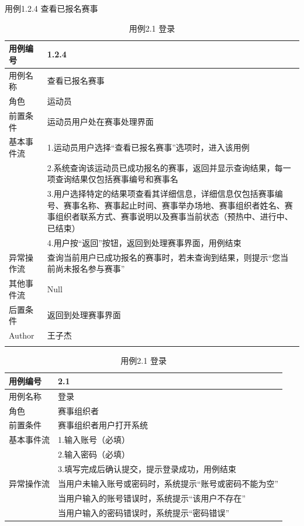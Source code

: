 \documentclass[a4paper,UTF8]{article}
\begin{document}
\begin{table}[H]
	\begin{center}
		\caption{用例1.2.4 查看已报名赛事}
		\label{table:Tab_uc124}
		\begin{tabular}{|p{}|p{}|}
			\hline\noalign{\smallskip}
			用例编号 & 1.2.4\\
			\hline
			用例名称 & 查看已报名赛事\\
			\hline
			角色 & 运动员\\
			\hline
			前置条件 & 运动员用户处在赛事处理界面\\
			\hline
			基本事件流 & 1.运动员用户选择“查看已报名赛事”选项时，进入该用例 \\& 2.系统查询该运动员已成功报名的赛事，返回并显示查询结果，每一项查询结果仅包括赛事编号和赛事名 \\& 3.用户选择特定的结果项查看其详细信息，详细信息仅包括赛事编号、赛事名称、赛事起止时间、赛事举办场地、赛事组织者姓名、赛事组织者联系方式、赛事说明以及赛事当前状态（预热中、进行中、已结束）\\& 4.用户按“返回”按钮，返回到处理赛事界面，用例结束\\
			\hline
			异常操作流 & 查询当前用户已成功报名的赛事时，若未查询到结果，则提示“您当前尚未报名参与赛事”  \\
			\hline
			其他事件流 & Null\\
			\hline
			后置条件 & 返回到处理赛事界面\\
			\hline
			Author & 王子杰 \\
			\noalign{\smallskip}
			\hline
			\noalign{\smallskip}
		\end{tabular}
	\caption{用例2.1 登录}
	\label{table:Tab_uc21}
	\begin{tabular}{|p{}|p{}|}
		\hline\noalign{\smallskip}
		用例编号 & 2.1\\
		\hline
		用例名称 &  登录\\
		\hline
		角色 & 赛事组织者\\
		\hline
		前置条件 & 赛事组织者用户打开系统\\
		\hline
		基本事件流 & 1.输入账号（必填）\\& 2.输入密码（必填） \\& 3.填写完成后确认提交，提示登录成功，用例结束\\
		\hline
		异常操作流 & 当用户未输入账号或密码时，系统提示“账号或密码不能为空” \\& 当用户输入的账号错误时，系统提示“该用户不存在” \\& 当用户输入的密码错误时，系统提示“密码错误”\\

\end{tabular}
\end{center}
\end{table}
\end{document}
